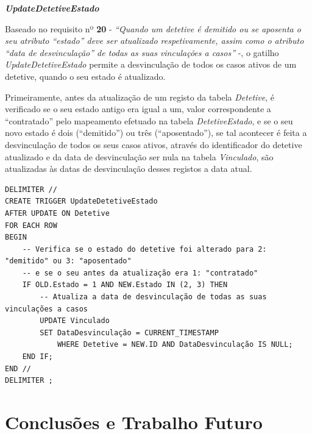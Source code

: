 \documentclass[a4paper,12pt]{scrreprt}
\begin{document}
\clearpage

\textit{\textbf{UpdateDetetiveEstado}}

Baseado no requisito nº \textbf{20} - \textit{“Quando um detetive é demitido ou se aposenta o seu atributo “estado” deve ser atualizado respetivamente, assim como o atributo “data de desvinculação” de todas as suas vinculações a casos”} -, o gatilho \textit{UpdateDetetiveEstado} permite a desvinculação de todos os casos ativos de um detetive, quando o seu estado é atualizado.

Primeiramente, antes da atualização de um registo da tabela \textit{Detetive}, é verificado se o seu estado antigo era igual a um, valor correspondente a “contratado” pelo mapeamento efetuado na tabela \textit{DetetiveEstado}, e se o seu novo estado é dois (“demitido”) ou três (“aposentado”), se tal acontecer é feita a desvinculação de todos os seus casos ativos, através do identificador do detetive atualizado e da data de desvinculação ser nula na tabela \textit{Vinculado}, são atualizadas às datas de desvinculação desses registos a data atual.

\vspace{0.4cm}
\begin{lstlisting}[escapechar=!]
DELIMITER //
CREATE TRIGGER UpdateDetetiveEstado
AFTER UPDATE ON Detetive
FOR EACH ROW
BEGIN
    -- Verifica se o estado do detetive foi alterado para 2: "demitido" ou 3: "aposentado"
    -- e se o seu antes da atualização era 1: "contratado"
    IF OLD.Estado = 1 AND NEW.Estado IN (2, 3) THEN
        -- Atualiza a data de desvinculação de todas as suas vinculações a casos
        UPDATE Vinculado
        SET DataDesvinculação = CURRENT_TIMESTAMP
            WHERE Detetive = NEW.ID AND DataDesvinculação IS NULL;
    END IF;
END //
DELIMITER ;
\end{lstlisting}



\chapter{Conclusões e Trabalho Futuro}
\end{document}
